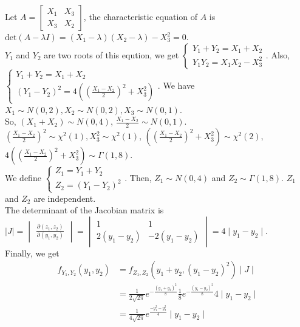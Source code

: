 \documentclass{homework}
\begin{document}
\question %
Let $A=\begin{bmatrix} X_{1} & X_{3} \\ X_{3} & X_{2} \end{bmatrix}$, the characteristic equation of $A$
is $\text{det}(A-\lambda I)=(X_{1}-\lambda)(X_{2}-\lambda)-X_{3}^2=0$.\\
$Y_{1}$ and $Y_{2}$ are two roots of this eqution, we get $\begin{cases}
    Y_{1}+Y_{2}=X_{1}+X_{2}\\
    Y_{1}Y_{2}=X_{1}X_{2}-X_{3}^2
    \end{cases}$.
Also, $\begin{cases}
    Y_{1}+Y_{2}=X_{1}+X_{2}\\
    (Y_{1}-Y_{2})^2=4((\frac{X_{1}-X_{2}}{2})^2+X_{3}^2)
    \end{cases}$.
We have $X_{1} \sim N(0,2), X_{2} \sim N(0,2), X_{3} \sim N(0,1)$.\\
So, $(X_{1}+X_{2}) \sim N(0,4)$, $\frac{X_{1}-X_{2}}{2} \sim N(0,1)$.\\ 
$(\frac{X_{1}-X_{2}}{2})^2 \sim \chi^2(1), X_{3}^2 \sim \chi^2(1)$, 
$((\frac{X_{1}-X_{2}}{2})^2 + X_{3}^2) \sim \chi^2(2)$, 
$4((\frac{X_{1}-X_{2}}{2})^2 + X_{3}^2) \sim \Gamma(1, 8)$.\\

We define $\begin{cases}
    Z_{1} = Y_{1}+Y_{2}\\
    Z_{2} = (Y_{1}-Y_{2})^2
    \end{cases}$.
Then, $Z_{1} \sim N(0,4)$ and $Z_{2} \sim \Gamma(1,8)$. $Z_{1}$ and $Z_{2}$ are independent.\\

The determinant of the Jacobian matrix is $\mid J \mid = \begin{vmatrix} \frac{\partial(z_{1},z_{2})}{\partial(y_{1},y_{2})}\end{vmatrix}
=\begin{vmatrix} 1 & 1 \\ 2(y_{1}-y_{2}) & -2(y_{1}-y_{2}) \end{vmatrix}
=4\mid y_{1}-y_{2} \mid$.\\
Finally, we get 
\begin{equation}
    \begin{aligned}
        f_{Y_{1}, Y_{2}}(y_{1}, y_{2}) & = f_{Z_{1}, Z_{2}}(y_{1}+y_{2}, (y_{1}-y_{2})^2)\mid J \mid\\
        &= \frac{1}{2\sqrt{2\pi}}e^{-\frac{(y_{1}+y_{2})^2}{8}} \frac{1}{8}e^{-\frac{(y_{1}-y_{2})^2}{8}}4\mid y_{1}-y_{2}\mid\\
        &= \frac{1}{4\sqrt{2\pi}} e^{\frac{-y_{1}^2-y_{2}^2}{4}} \mid y_{1}-y_{2}\mid \\
    \end{aligned}
\end{equation}
\end{document}
